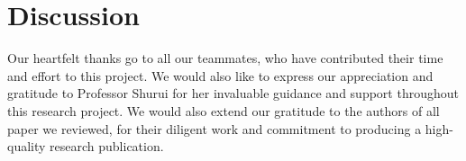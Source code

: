 \documentclass[acmtog]{acmart}
\begin{document}
\section{Discussion}
\label{discussion}


\begin{acks}
Our heartfelt thanks go to all our teammates, who have contributed their time and effort to this project. 
We would also like to express our appreciation and gratitude to Professor Shurui for her invaluable guidance and support throughout this research project. 
We would also extend our gratitude to the authors of all paper we reviewed, for their diligent work and commitment to producing a high-quality research publication.
\end{acks}





\end{document}
